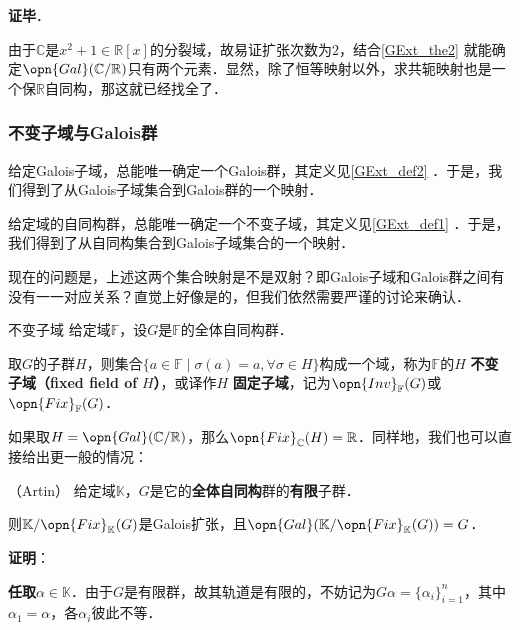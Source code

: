 \textbf{证毕}．



由于$\mathbb{C}$是$x^2+1\in\mathbb{R}[x]$的分裂域，故易证扩张次数为$2$，结合\autoref{GExt_the2} 就能确定$\opn{Gal}(\mathbb{C}/\mathbb{R})$只有两个元素．显然，除了恒等映射以外，求共轭映射也是一个保$\mathbb{R}$自同构，那这就已经找全了．



\subsubsection{不变子域与Galois群}

给定Galois子域，总能唯一确定一个Galois群，其定义见\autoref{GExt_def2} ．于是，我们得到了从Galois子域集合到Galois群的一个映射．

给定域的自同构群，总能唯一确定一个不变子域，其定义见\autoref{GExt_def1} ．于是，我们得到了从自同构集合到Galois子域集合的一个映射．

现在的问题是，上述这两个集合映射是不是双射？即Galois子域和Galois群之间有没有一一对应关系？直觉上好像是的，但我们依然需要严谨的讨论来确认．



\begin{definition}{不变子域}\label{GExt_def1}
给定域$\mathbb{F}$，设$G$是$\mathbb{F}$的全体自同构群．

取$G$的子群$H$，则集合$\{a\in\mathbb{F}\mid \sigma(a)=a, \forall \sigma\in H\}$构成一个域，称为$\mathbb{F}$的$H$ \textbf{不变子域（fixed field of }$H$\textbf{）}，或译作$H$ \textbf{固定子域}，记为$\opn{Inv}_\mathbb{F}(G)$或$\opn{Fix}_\mathbb{F}(G)$．
\end{definition}

如果取$H=\opn{Gal}(\mathbb{C}/\mathbb{R})$，那么$\opn{Fix}_{\mathbb{C}}(H)=\mathbb{R}$．同样地，我们也可以直接给出更一般的情况：



\begin{theorem}{（Artin）}\label{GExt_the3}
给定域$\mathbb{K}$，$G$是它的\textbf{全体自同构}群的\textbf{有限}子群．

则$\mathbb{K}/\opn{Fix}_\mathbb{K}(G)$是Galois扩张，且$\opn{Gal}(\mathbb{K}/\opn{Fix}_\mathbb{K}(G))=G$．
\end{theorem}

\textbf{证明}：

\textbf{任取}$\alpha\in\mathbb{K}$．由于$G$是有限群，故其轨道是有限的，不妨记为$G\alpha=\{\alpha_i\}_{i=1}^n$，其中$\alpha_1=\alpha$，各$\alpha_i$彼此不等．

